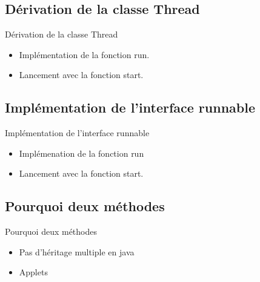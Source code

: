\section{\sectitle}
\begin{frame}{\sectitle}
    \def\subsectitle{Dérivation de la classe Thread}
    \subsection{\subsectitle}
    \begin{block}{\subsectitle}
        \begin{itemize}
            \item Implémentation de la fonction run.
            \item Lancement avec la fonction start.
        \end{itemize}
    \end{block}

    \def\subsectitle{Implémentation de l'interface runnable}
    \subsection{\subsectitle}
    \begin{block}{\subsectitle}
        \begin{itemize}
            \item Implémenation de la fonction run
            \item Lancement avec la fonction start.
        \end{itemize}
    \end{block}
    \def\subsectitle{Pourquoi deux méthodes}
    \subsection{\subsectitle}
    \begin{block}{\subsectitle}
        \begin{itemize}
            \item Pas d'héritage multiple en java
            \item Applets 
        \end{itemize}
    \end{block}
\end{frame}


